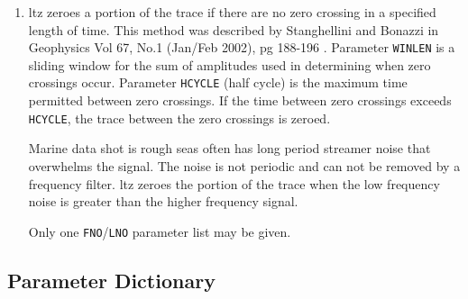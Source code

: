 \begin{enumerate}
\item \gls{ltz} zeroes a portion of the trace if there are no zero crossing in
    a specified length of time.  This method was described by Stanghellini and
    Bonazzi in Geophysics Vol 67, No.1 (Jan/Feb 2002), pg 188-196
    \cite{Stanghellini2002}.  Parameter \texttt{WINLEN} is a sliding window for
    the sum of amplitudes used in determining when zero crossings occur.
    Parameter \texttt{HCYCLE} (half cycle) is the maximum time permitted
    between zero crossings.  If the time between zero crossings exceeds
    \texttt{HCYCLE}, the trace between the zero crossings is zeroed.

        Marine data \gls{shot} is rough seas often has long period streamer
    noise that overwhelms the signal.  The noise is not periodic
    and can not be removed by a frequency filter.  \gls{ltz} zeroes the
    portion of the trace when the low frequency noise is greater
    than the higher frequency signal.

    Only one \texttt{FNO}/\texttt{LNO} parameter list may be given.
\end{enumerate}

\subsection{Parameter Dictionary}

